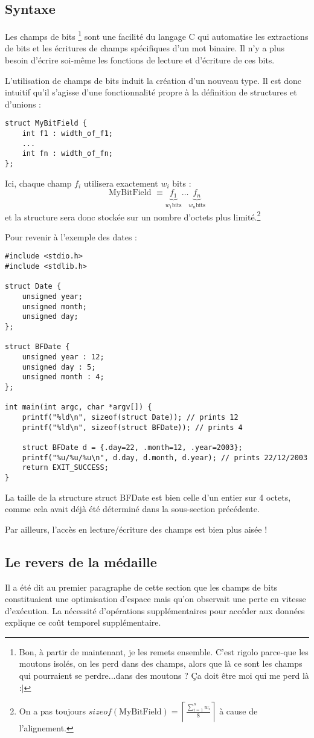 \documentclass[../../../main.tex]{subfiles}
\begin{document}
\subsection{Syntaxe}
Les champs de bits \footnote{Bon, à partir de maintenant, je les remets ensemble. C'est rigolo parce-que les moutons isolés, on les perd dans des champs, alors que là ce sont les champs qui pourraient se perdre...dans des moutons ? Ça doit être moi qui me perd là :$|$} sont une facilité du langage C qui automatise les extractions de bits et les écritures
de champs spécifiques d'un mot binaire. Il n'y a plus besoin d'écrire soi-même les fonctions de lecture
et d'écriture de ces bits.

L'utilisation de champs de bits induit la création d'un nouveau type. Il est donc intuitif qu'il s'agisse d'une fonctionnalité propre à la définition de structures et d'unions :
\begin{verbatim}
struct MyBitField {
	int f1 : width_of_f1;
	...
	int fn : width_of_fn;
};
\end{verbatim}
Ici, chaque champ $f_{i}$ utilisera exactement $w_{i}$ bits :
$$\text{MyBitField }\equiv \underbrace{f_{1}}_{w_{1} \text{bits}}\dots \underbrace{f_{n}}_{w_{n} \text{bits}}$$
et la structure sera donc stockée sur un nombre d'octets plus limité.\footnote{On a pas toujours $sizeof(\text{MyBitField}) = \displaystyle\left\lceil\frac{\sum_{i= 1}^{n}w_{i}}{8}\right\rceil$ à cause de l'alignement.}

Pour revenir à l'exemple des dates :
\begin{verbatim}
#include <stdio.h>
#include <stdlib.h>

struct Date {
	unsigned year;
	unsigned month;
	unsigned day;
};

struct BFDate {
	unsigned year : 12;
	unsigned day : 5;
	unsigned month : 4;
};

int main(int argc, char *argv[]) {
	printf("%ld\n", sizeof(struct Date)); // prints 12
	printf("%ld\n", sizeof(struct BFDate)); // prints 4

	struct BFDate d = {.day=22, .month=12, .year=2003};
	printf("%u/%u/%u\n", d.day, d.month, d.year); // prints 22/12/2003
	return EXIT_SUCCESS;
}
\end{verbatim}
La taille de la structure \textsf{struct BFDate} est bien celle d'un entier sur 4 octets, comme cela avait déjà été déterminé dans la sous-section précédente.

Par ailleurs, l'accès en lecture/écriture des champs est bien plus aisée !
\subsection{Le revers de la médaille}
Il a été dit au premier paragraphe de cette section que les champs de bits constituaient une optimisation d'espace mais qu'on observait une perte en vitesse d'exécution. La nécessité d'opérations supplémentaires pour accéder aux données explique ce coût temporel supplémentaire.
\end{document}
